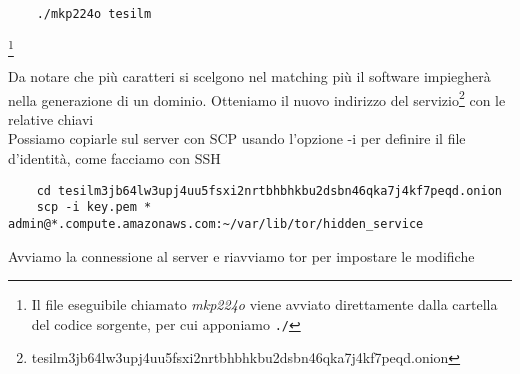\begin{lstlisting}
    ./mkp224o tesilm
\end{lstlisting}
\footnote{Il file eseguibile chiamato \emph{mkp224o} viene avviato direttamente dalla cartella del codice sorgente, per cui apponiamo \lstinline{./}}

Da notare che più caratteri si scelgono nel matching più il software impiegherà nella generazione di un dominio. 
Otteniamo il nuovo indirizzo del servizio\footnote{tesilm3jb64lw3upj4uu5fsxi2nrtbhbhkbu2dsbn46qka7j4kf7peqd.onion} con le relative chiavi \\
Possiamo copiarle sul server con SCP usando l'opzione -i per definire il file d'identità, come facciamo con SSH

\begin{lstlisting}
    cd tesilm3jb64lw3upj4uu5fsxi2nrtbhbhkbu2dsbn46qka7j4kf7peqd.onion
    scp -i key.pem * admin@*.compute.amazonaws.com:~/var/lib/tor/hidden_service
\end{lstlisting}

Avviamo la connessione al server e riavviamo tor per impostare le modifiche



\newpage

